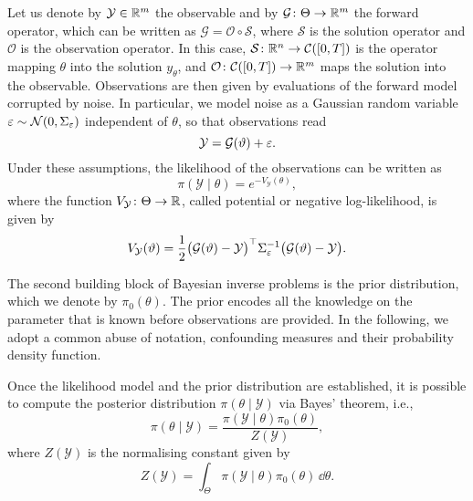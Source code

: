 \documentclass[10pt]{article}
\begin{document}
Let us denote by $\mathcal Y \in \mathbb{R}^m$ the observable and by $\mathcal G\colon \Theta \to \mathbb{R}^m$ the forward operator, which can be written as $\mathcal G = \mathcal O \circ \mathcal S$, where $\mathcal S$ is the solution operator and $\mathcal O$ is the observation operator. In this case, $\mathcal S \colon \mathbb{R}^n \to \mathcal C([0, T])$ is the operator mapping $\theta$ into the solution $y_\theta$, and $\mathcal O \colon \mathcal C([0, T]) \to \mathbb{R}^m$ maps the solution into the observable. Observations are then given by evaluations of the forward model corrupted by noise. In particular, we model noise as a Gaussian random variable $\varepsilon \sim \mathcal{N}(0, \Sigma_\varepsilon)$ independent of $\theta$, so that observations read
\begin{equation}
	\mathcal{Y} = \mathcal{G}(\vartheta) + \varepsilon.
\end{equation}
Under these assumptions, the likelihood of the observations can be written as
\begin{equation}
	\pi(\mathcal{Y} \mid \theta) = e^{-V_\mathcal{Y}(\theta)},
\end{equation}
where the function $V_\mathcal{Y}\colon\Theta \to \mathbb{R}$, called potential or negative log-likelihood, is given by
\begin{equation}
	V_\mathcal{Y}(\vartheta) = \frac{1}{2}\big(\mathcal{G}(\vartheta) - \mathcal{Y}\big)^\top \Sigma_\varepsilon^{-1} \big(\mathcal{G}(\vartheta) - \mathcal{Y}\big).
\end{equation}

The second building block of Bayesian inverse problems is the prior distribution, which we denote by $\pi_0(\theta)$. The prior encodes all the knowledge on the parameter that is known before observations are provided. In the following, we adopt a common abuse of notation, confounding measures and their probability density function. 

Once the likelihood model and the prior distribution are established, it is possible to compute the posterior distribution $\pi(\theta \mid \mathcal{Y})$ via Bayes' theorem, i.e.,
\begin{equation}
	\pi(\theta\mid\mathcal{Y}) = \frac{\pi(\mathcal{Y}\mid \theta)\pi_0(\theta)}{Z(\mathcal{Y})},
\end{equation}
where $Z(\mathcal{Y})$ is the normalising constant given by
\begin{equation}
	Z(\mathcal{Y}) = \int_{\Theta} \pi(\mathcal{Y}\mid \theta) \pi_0(\theta) \, \dd \theta.
\end{equation}
\end{document}
